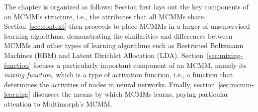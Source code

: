 
The chapter is organized as follows: Section first lays out the key components of an MCMM's structure, i.e., the attributes that all MCMMs share. Section~\ref{sec:context} then proceeds to place MCMMs in a larger of unsupervised learning algorithms, demonstrating 
the similarities and differences between MCMMs and other types of learning algorithms such as Restricted Boltzmann Machines (RBM) and Latent Dirichlet Allocation (LDA). Section~\ref{sec:mixing-function} focuses a particularly important component of an MCMM, namely its \emph{mixing function}, which is a type of activation function, i.e., a function that determines the activities of nodes in neural networks.  
Finally, section~\ref{sec:mcmm-learning} discusses the means by which MCMMs learns, paying particular attention to Multimorph's MCMM.


